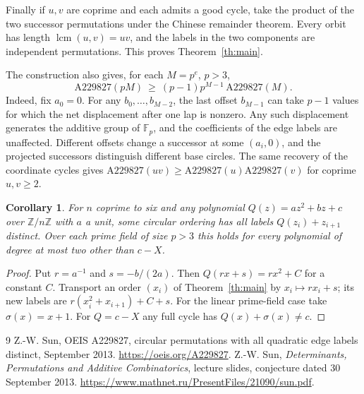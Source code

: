 \documentclass[11pt]{article}
\newtheorem{corollary}[theorem]{Corollary}
\newcommand{\F}{\mathbb F}
\begin{document}
Finally if $u,v$ are coprime and each admits a good cycle, take the product of the two successor permutations under the Chinese remainder theorem. Every orbit has length $\operatorname{lcm}(u,v)=uv$, and the labels in the two components are independent permutations. This proves Theorem~\ref{th:main}.

The construction also gives, for each $M=p^e$, $p>3$,
\[
    \mathrm{A229827}(pM)\ \ge\ (p-1)p^{M-1}\,\mathrm{A229827}(M).
\]
Indeed, fix $a_0=0$. For any $b_0,\ldots,b_{M-2}$, the last offset $b_{M-1}$ can take $p-1$ values for which the net displacement after one lap is nonzero. Any such displacement generates the additive group of $\F_p$, and the coefficients of the edge labels are unaffected. Different offsets change a successor at some $(a_i,0)$, and the projected successors distinguish different base circles. The same recovery of the coordinate cycles gives $\mathrm{A229827}(uv)\ge\mathrm{A229827}(u)\mathrm{A229827}(v)$ for coprime $u,v\ge2$.

\begin{corollary}
For $n$ coprime to six and any polynomial $Q(z)=a z^2+bz+c$ over $\mathbb Z/n\mathbb Z$ with $a$ a unit, some circular ordering has all labels $Q(z_i)+z_{i+1}$ distinct. Over each prime field of size $p>3$ this holds for every polynomial of degree at most two other than $c-X$.
\end{corollary}
\begin{proof}
Put $r=a^{-1}$ and $s=-b/(2a)$. Then $Q(rx+s)=r x^2+C$ for a constant $C$. Transport an order $(x_i)$ of Theorem~\ref{th:main} by $x_i\mapsto rx_i+s$; its new labels are $r(x_i^2+x_{i+1})+C+s$. For the linear prime-field case take $\sigma(x)=x+1$. For $Q=c-X$ any full cycle has $Q(x)+\sigma(x)\ne c$.
\end{proof}

\begin{thebibliography}{9}
 Z.-W. Sun, OEIS A229827, circular permutations with all quadratic edge labels distinct, September 2013. \url{https://oeis.org/A229827}.
 Z.-W. Sun, \emph{Determinants, Permutations and Additive Combinatorics}, lecture slides, conjecture dated 30 September 2013. \url{https://www.mathnet.ru/PresentFiles/21090/sun.pdf}.
\end{thebibliography}
\end{document}
